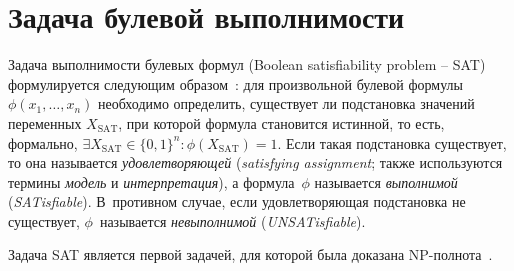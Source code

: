 


\section{Задача булевой выполнимости}
\label{sec:sat}

Задача выполнимости булевых формул (Boolean satisfiability problem \--- SAT) формулируется следующим образом~\cite{handbook-sat}: для произвольной булевой формулы~$\phi(x_1, \dotsc, x_n)$ необходимо определить, существует ли подстановка значений переменных $X_\text{SAT}$, при которой формула становится истинной, то есть, формально, $\exists X_\text{SAT} \in \{0,1\}^n : \phi(X_\text{SAT}) = 1$.
Если такая подстановка существует, то она называется \textit{удовлетворяющей} (\textit{satisfying assignment}; также используются термины \textit{модель} и \textit{интерпретация}), а формула~$\phi$ называется \textit{выполнимой} (\textit{SATisfiable}).
В~противном случае, если удовлетворяющая подстановка не существует, $\phi$~называется \textit{невыполнимой} (\textit{UNSATisfiable}).

Задача SAT является первой задачей, для которой была доказана NP-полнота~\cite{cook}.



